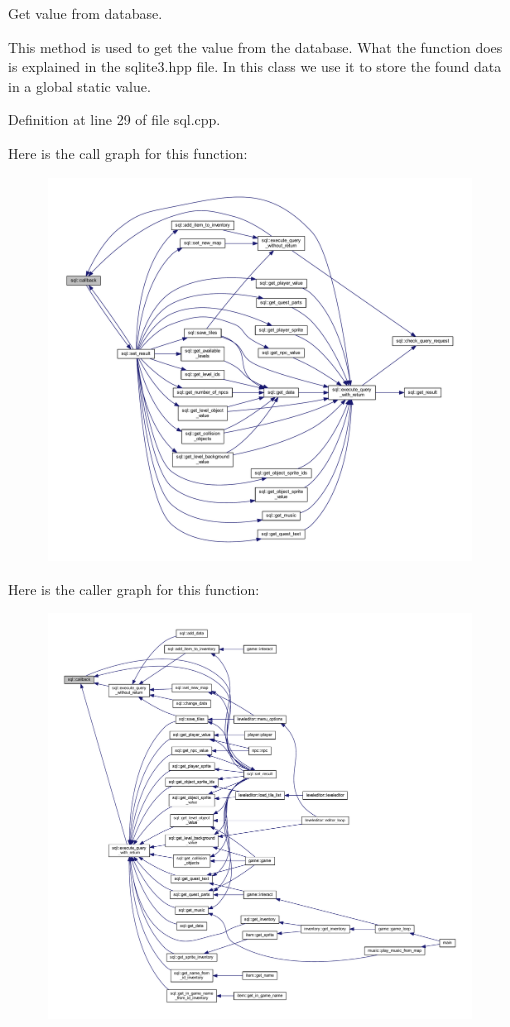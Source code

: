 Get value from database. 

This method is used to get the value from the database. What the function does is explained in the sqlite3.\+hpp file. In this class we use it to store the found data in a global static value. 

Definition at line 29 of file sql.\+cpp.

Here is the call graph for this function\+:
\nopagebreak
\begin{figure}[H]
\begin{center}
\leavevmode
\includegraphics[width=350pt]{classsql_aff61710f28dd54827b67a99c24fbdb0d_cgraph}
\end{center}
\end{figure}
Here is the caller graph for this function\+:
\nopagebreak
\begin{figure}[H]
\begin{center}
\leavevmode
\includegraphics[width=350pt]{classsql_aff61710f28dd54827b67a99c24fbdb0d_icgraph}
\end{center}
\end{figure}
